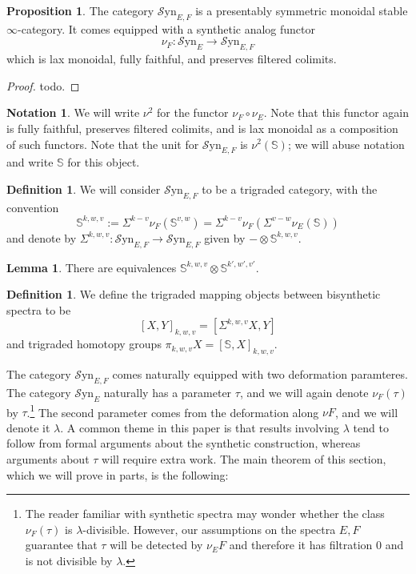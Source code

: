 \documentclass[10pt]{amsart}
\theoremstyle{definition}
\numberwithin{figure}{section}
\numberwithin{equation}{section}
\newtheorem{lemma}[figure]{Lemma}
\newtheorem{proposition}[figure]{Proposition}
\newtheorem{definition}[figure]{Definition}
\newtheorem{notation}[figure]{Notation}
\theoremstyle{cited}
\newcommand{\bS}{\mathbb{S}}
\newcommand{\Syn}{\mathcal{S}\mathrm{yn}}
\begin{document}
\begin{proposition}
  The category $\Syn_{E,F}$ is a presentably symmetric monoidal stable $\infty$-category. It comes equipped with a synthetic analog functor
  \[
  \nu_{F}: \Syn_{E}\to \Syn_{E,F}
  \]
  which is lax monoidal, fully faithful, and preserves filtered colimits. 
\end{proposition}

\begin{proof}
  todo.
\end{proof}

\begin{notation}
  We will write $\nu^2$ for the functor $\nu_F\circ \nu_E$. Note that this functor again is fully faithful, preserves filtered colimits, and is lax monoidal as a composition of such functors. Note that the unit for $\Syn_{E,F}$ is $\nu^2(\bS)$; we will abuse notation and write $\bS$ for this object.
\end{notation}

\begin{definition}
  We will consider $\Syn_{E,F}$ to be a trigraded category, with the convention
  \[
  \bS^{k,w,v}:=\Sigma^{k-v}\nu_F(\bS^{v,w})=\Sigma^{k-v}\nu_F(\Sigma^{v-w}\nu_E(\bS))
  \]
  and denote by $\Sigma^{k,w,v}:\Syn_{E,F}\to \Syn_{E,F}$ given by $-\otimes \bS^{k,w,v}$.
\end{definition}

\begin{lemma}
  There are equivalences $\bS^{k,w,v}\otimes \bS^{k',w',v'}$.
\end{lemma}

\begin{definition}
  We define the trigraded mapping objects between bisynthetic spectra to be
  \[
  [X,Y]_{k,w,v}=[\Sigma^{k,w,v}X, Y]
  \]
  and trigraded homotopy groups $\pi_{k,w,v}X=[\bS, X]_{k,w,v}$.
\end{definition}

The category $\Syn_{E,F}$ comes naturally equipped with two deformation paramteres. The category $\Syn_E$ naturally has a parameter $\tau$, and we will again denote $\nu_{F}(\tau)$ by $\tau$.\footnote{The reader familiar with synthetic spectra may wonder whether the class $\nu_F(\tau)$ is $\lambda$-divisible. However, our assumptions on the spectra $E,F$ guarantee that $\tau$ will be detected by $\nu_E F$ and therefore it has filtration $0$ and is not divisible by $\lambda$.} The second parameter comes from the deformation along $\nu F$, and we will denote it $\lambda$. A common theme in this paper is that results involving $\lambda$ tend to follow from formal arguments about the synthetic construction, whereas arguments about $\tau$ will require extra work. The main theorem of this section, which we will prove in parts, is the following:
\end{document}

